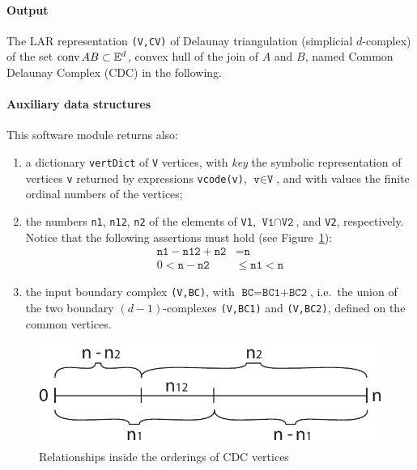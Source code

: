 \documentclass[11pt,oneside]{article}	%
\def\conv{\mbox{\textrm{conv}\,}}
\def\E{\mathbb{E}}
\def\conv{\mbox{\rm conv}\,}
\begin{document}
\paragraph{Output} 
The LAR representation \texttt{(V,CV)} of Delaunay triangulation (simplicial $d$-complex) of the set $\conv AB \subset \E^d$, convex hull of the join of $A$ and $B$, named Common Delaunay Complex (CDC) in the following.

\paragraph{Auxiliary data structures} 
This software module returns also:

\begin{enumerate}
\item 
a dictionary \texttt{vertDict} of \texttt{V} vertices, with \emph{key} the symbolic representation of vertices \texttt{v} returned by expressions \texttt{vcode(v)}, $\texttt{v}\in \texttt{V}$, and with values the finite ordinal numbers of the vertices;

\item 
the numbers \texttt{n1}, \texttt{n12}, \texttt{n2} of the elements of \texttt{V1}, $\texttt{V1}\cap\texttt{V2}$, and \texttt{V2}, respectively. Notice that the following assertions must hold (see Figure~\ref{fig:bounds}):
\begin{align}
\texttt{n1} - \texttt{n12} + \texttt{n2} &= \texttt{n} \\
0 < \texttt{n} - \texttt{n2}  &\leq  \texttt{n1}  <  \texttt{n} 
\end{align}

\item the input boundary complex \texttt{(V,BC)}, with $\texttt{BC} = \texttt{BC1+BC2}$, i.e.~the union of the  two boundary $(d-1)$-complexes \texttt{(V,BC1)} and \texttt{(V,BC2)}, defined on the common vertices.
\end{enumerate}

\begin{figure}[htbp] %
   \centering
   \includegraphics[width=0.5\linewidth]{images/bounds} 
   \caption{Relationships inside the orderings of CDC vertices}
   \label{fig:bounds}
\end{figure}
\end{document}
